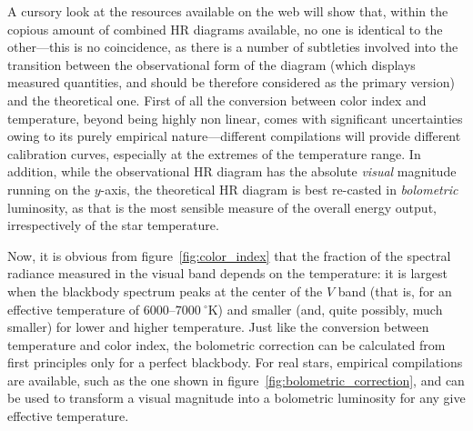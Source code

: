 A cursory look at the resources available on the web will show that, within the
copious amount of combined HR diagrams available, no one is identical to the
other---this is no coincidence, as there is a number of subtleties involved into
the transition between the observational form of the diagram (which displays
measured quantities, and should be therefore considered as the primary version)
and the theoretical one. First of all the conversion between color index and
temperature, beyond being highly non linear, comes with significant uncertainties
owing to its purely empirical nature---different compilations will provide different
calibration curves, especially at the extremes of the temperature range.
In addition, while the observational HR diagram has the absolute \emph{visual}
magnitude running on the $y$-axis, the theoretical HR diagram is best re-casted
in \emph{bolometric} luminosity, as that is the most sensible measure of the overall
energy output, irrespectively of the star temperature.

Now, it is obvious from figure~\ref{fig:color_index} that the fraction of the spectral
radiance measured in the visual band depends on the temperature: it is largest when
the blackbody spectrum peaks at the center of the $V$ band (that is, for an effective
temperature of $6000$--$7000~^\circ$K) and smaller (and, quite possibly, much smaller)
for lower and higher temperature. Just like the conversion between temperature
and color index, the bolometric correction can be calculated from first principles
only for a perfect blackbody. For real stars, empirical compilations are available,
such as the one shown in figure~\ref{fig:bolometric_correction}, and can be used
to transform a visual magnitude into a bolometric luminosity for any give effective
temperature.

\begin{marginfigure}
    
    \caption{Empirical parametrization of the bolometric correction, adapted
      from~\cite{1998JRASC..92...36R}. Note that for very hot and very cold
      stars the bolometric correction can exceed $5$~magnitudes---that is, a factor
      of $100$---assuming that the (arbitrary) zero point is set in such a way
      that the correction is $\sim 0$ at the peak.}
    \label{fig:bolometric_correction}
\end{marginfigure}

